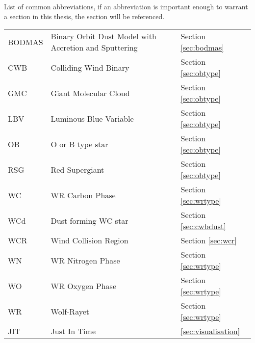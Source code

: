 \begin{abbreviations}
List of common abbreviations, if an abbreviation is important enough to warrant a section in this thesis, the section will be referenced.

\begin{table}[h]
  \centering
  \begin{tabular}{l|l|l}
    
    \hline

    BODMAS & Binary Orbit Dust Model with Accretion and Sputtering & Section \ref{sec:bodmas} \\
    CWB & Colliding Wind Binary  & Section \ref{sec:obtype} \\
    GMC & Giant Molecular Cloud & Section \ref{sec:obtype}\\
    LBV & Luminous Blue Variable & Section \ref{sec:obtype} \\
    OB  & O or B type star & Section \ref{sec:obtype} \\ 
    RSG & Red Supergiant & Section \ref{sec:obtype} \\
    WC  & WR Carbon Phase & Section \ref{sec:wrtype} \\
    WCd & Dust forming WC star & Section \ref{sec:cwbdust} \\
    WCR & Wind Collision Region & Section \ref{sec:wcr} \\
    WN  & WR Nitrogen Phase & Section \ref{sec:wrtype} \\
    WO  & WR Oxygen Phase & Section \ref{sec:wrtype} \\
    WR  & Wolf-Rayet & Section \ref{sec:wrtype} \\

    \hline

    JIT & Just In Time & \ref{sec:visualisation} \\

  \end{tabular} 
  \label{tbl:Abbreviations}
\end{table}



\end{abbreviations}

